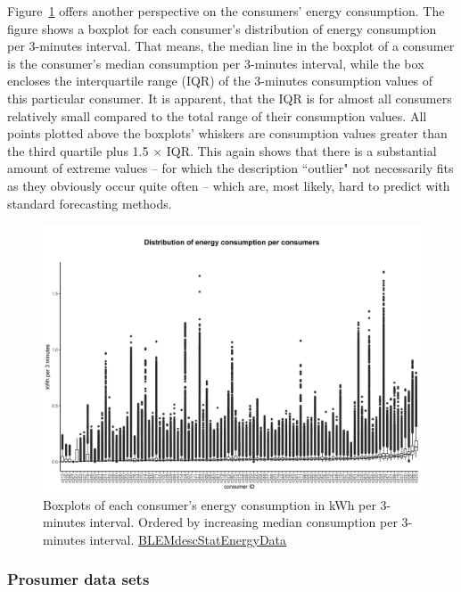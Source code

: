 Figure~\ref{Fig:cons_boxplots_consumption} offers another perspective on the consumers' energy consumption. The figure shows a boxplot for each consumer's distribution of energy consumption per 3-minutes interval. That means, the median line in the boxplot of a consumer is the consumer's median consumption per 3-minutes interval, while the box encloses the interquartile range (IQR) of the 3-minutes consumption values of this particular consumer. It is apparent, that the IQR is for almost all consumers relatively small compared to the total range of their consumption values. All points plotted above the boxplots' whiskers are consumption values greater than the third quartile plus 1.5 $\times$ IQR. This again shows that there is a substantial amount of extreme values -- for which the description ``outlier" not necessarily fits as they obviously occur quite often -- which are, most likely, hard to predict with standard forecasting methods.
%
\begin{figure}[ht]
 \centering
\includegraphics[width=\textwidth]{thesis/graphs/consumer_boxplots_consumption.jpg}
\caption[Boxplots of each consumer's energy consumption in kWh/3-minutes interval]{Boxplots of each consumer's energy consumption in kWh per 3-minutes interval. Ordered by increasing median consumption per 3-minutes interval. \quantnet\href{https://github.com/QuantLet/BLEM/tree/master/BLEMdescStatEnergyData}{BLEMdescStatEnergyData}}
\label{Fig:cons_boxplots_consumption}
\end{figure}



\subsubsection{Prosumer data sets}

